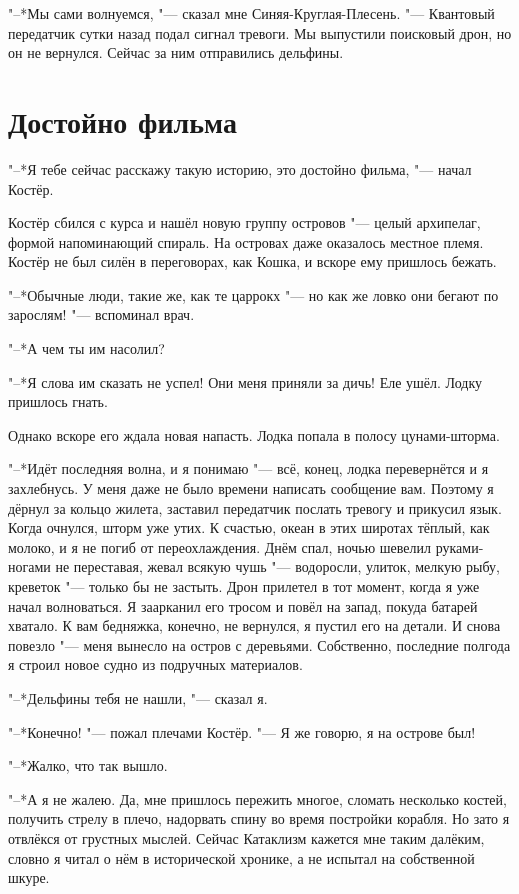 "--*Мы сами волнуемся, "--- сказал мне Синяя-Круглая-Плесень.
"--- Квантовый передатчик сутки назад подал сигнал тревоги.
Мы выпустили поисковый дрон, но он не вернулся.
Сейчас за ним отправились дельфины.

\section{Достойно фильма}

"--*Я тебе сейчас расскажу такую историю, это достойно фильма, "--- начал Костёр.

Костёр сбился с курса и нашёл новую группу островов "--- целый архипелаг, формой напоминающий спираль.
На островах даже оказалось местное племя.
Костёр не был силён в переговорах, как Кошка, и вскоре ему пришлось бежать.

"--*Обычные люди, такие же, как те царрокх "--- но как же ловко они бегают по зарослям! "--- вспоминал врач.

"--*А чем ты им насолил?

"--*Я слова им сказать не успел!
Они меня приняли за дичь!
Еле ушёл.
Лодку пришлось гнать.

Однако вскоре его ждала новая напасть.
Лодка попала в полосу цунами-шторма.

"--*Идёт последняя волна, и я понимаю "--- всё, конец, лодка перевернётся и я захлебнусь.
У меня даже не было времени написать сообщение вам.
Поэтому я дёрнул за кольцо жилета, заставил передатчик послать тревогу и прикусил язык.
Когда очнулся, шторм уже утих.
К счастью, океан в этих широтах тёплый, как молоко, и я не погиб от переохлаждения.
Днём спал, ночью шевелил руками-ногами не переставая, жевал всякую чушь "--- водоросли, улиток, мелкую рыбу, креветок "--- только бы не застыть.
Дрон прилетел в тот момент, когда я уже начал волноваться.
Я заарканил его тросом и повёл на запад, покуда батарей хватало.
К вам бедняжка, конечно, не вернулся, я пустил его на детали.
И снова повезло "--- меня вынесло на остров с деревьями.
Собственно, последние полгода я строил новое судно из подручных материалов.

"--*Дельфины тебя не нашли, "--- сказал я.

"--*Конечно! "--- пожал плечами Костёр.
"--- Я же говорю, я на острове был!

"--*Жалко, что так вышло.

"--*А я не жалею.
Да, мне пришлось пережить многое, сломать несколько костей, получить стрелу в плечо, надорвать спину во время постройки корабля.
Но зато я отвлёкся от грустных мыслей.
Сейчас Катаклизм кажется мне таким далёким, словно я читал о нём в исторической хронике, а не испытал на собственной шкуре.

